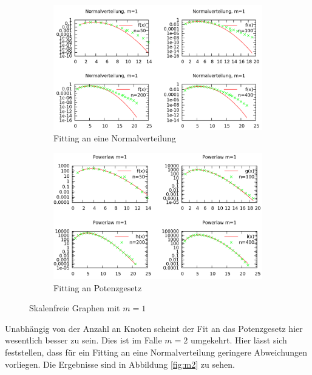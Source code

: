 \documentclass[10pt]{article}
\begin{document}
\begin{figure}[h!]
\begin{subfigure}{.5\textwidth}
  \centering
  \includegraphics[width=1\linewidth]{../Results/Normal_M1_logscale.png}
  \caption{Fitting an eine Normalverteilung}
\end{subfigure}%
\begin{subfigure}{.5\textwidth}
  \centering
  \includegraphics[width=1\linewidth]{../Results/Power_M1_logscale.png}
  \caption{Fitting an Potenzgesetz}
\end{subfigure}
\caption{Skalenfreie Graphen mit $m=1$}
\label{fig:m1}
\end{figure}

Unabhängig von der Anzahl an Knoten scheint der Fit an das Potenzgesetz hier wesentlich besser zu sein. Dies ist im Falle $m=2$ umgekehrt. Hier lässt sich feststellen, dass für ein Fitting an eine Normalverteilung geringere Abweichungen vorliegen. Die Ergebnisse sind in Abbildung \ref{fig:m2} zu sehen.
\end{document}
